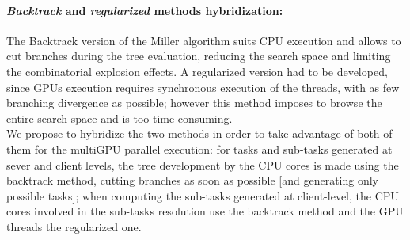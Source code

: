 \paragraph{\emph{Backtrack} and \emph{regularized} methods hybridization: } 
The Backtrack version of the Miller algorithm suits CPU execution and allows to cut branches during the tree evaluation, reducing the search space and limiting the combinatorial explosion effects. A regularized version had to be developed, since GPUs execution requires synchronous execution of the threads, with as few branching divergence as possible; however this method imposes to browse the entire search space and is too time-consuming. \\
We propose to hybridize the two methods in order to take advantage of both of them for the multiGPU parallel execution: 
for tasks and sub-tasks generated at sever and client levels, the tree development by the CPU cores is made using the backtrack method, cutting branches as soon as possible [and generating only possible tasks]; when computing the sub-tasks generated at client-level, the CPU cores involved in the sub-tasks resolution use the backtrack method and the GPU threads the regularized one. 




 
